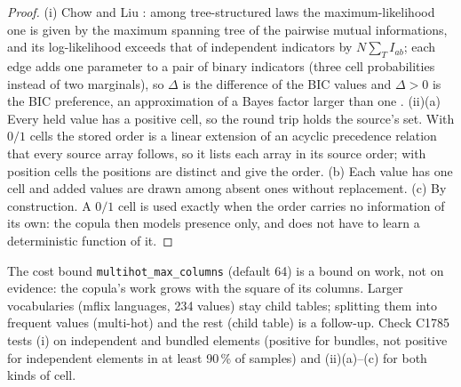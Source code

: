 \begin{proof}
(i) Chow and Liu \cite{chowliu1968}: among tree-structured laws the maximum-likelihood one is given by the maximum spanning tree of the pairwise mutual informations, and its log-likelihood exceeds that of independent indicators by $N\sum_{T}I_{ab}$; each edge adds one parameter to a pair of binary indicators (three cell probabilities instead of two marginals), so $\Delta$ is the difference of the BIC values \cite{schwarz1978} and $\Delta>0$ is the BIC preference, an approximation of a Bayes factor larger than one \cite{kassraftery1995}. (ii)(a) Every held value has a positive cell, so the round trip holds the source's set. With $0/1$ cells the stored order is a linear extension of an acyclic precedence relation that every source array follows, so it lists each array in its source order; with position cells the positions are distinct and give the order. (b) Each value has one cell and added values are drawn among absent ones without replacement. (c) By construction. A $0/1$ cell is used exactly when the order carries no information of its own: the copula then models presence only, and does not have to learn a deterministic function of it.\end{proof}
\noindent The cost bound \texttt{multihot\_max\_columns} (default 64) is a bound on work, not on evidence: the copula's work grows with the square of its columns. Larger vocabularies (mflix languages, 234 values) stay child tables; splitting them into frequent values (multi-hot) and the rest (child table) is a follow-up. Check C1785 tests (i) on independent and bundled elements (positive for bundles, not positive for independent elements in at least 90\,\% of samples) and (ii)(a)--(c) for both kinds of cell.

